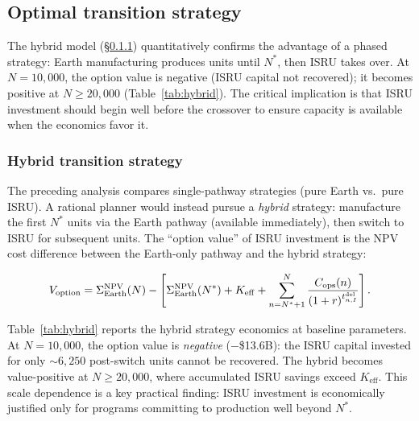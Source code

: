 \documentclass[5p,twocolumn]{elsarticle}
\begin{document}
\subsection{Optimal transition strategy}

The hybrid model (\S\ref{sec:hybrid}) quantitatively confirms the advantage of a phased strategy: Earth manufacturing produces units until $N^*$, then ISRU takes over. At $N = 10{,}000$, the option value is negative (ISRU capital not recovered); it becomes positive at $N \geq 20{,}000$ (Table~\ref{tab:hybrid}). The critical implication is that ISRU investment should begin well before the crossover to ensure capacity is available when the economics favor it.

\subsubsection{Hybrid transition strategy}
\label{sec:hybrid}

The preceding analysis compares single-pathway strategies (pure Earth vs.\ pure ISRU). A rational planner would instead pursue a \emph{hybrid} strategy: manufacture the first $N^*$ units via the Earth pathway (available immediately), then switch to ISRU for subsequent units. The ``option value'' of ISRU investment is the NPV cost difference between the Earth-only pathway and the hybrid strategy:

\begin{equation}\footnotesize
  V_{\mathrm{option}} = \Sigma_{\mathrm{Earth}}^{\mathrm{NPV}}(N) - \left[\Sigma_{\mathrm{Earth}}^{\mathrm{NPV}}(N^*) + K_{\mathrm{eff}} + \sum_{n=N^*+1}^{N} \frac{C_{\mathrm{ops}}(n)}{(1+r)^{t_{n,I}^{\mathrm{del}}}}\right].
  \label{eq:hybrid}
\end{equation}

Table~\ref{tab:hybrid} reports the hybrid strategy economics at baseline parameters. At $N = 10{,}000$, the option value is \emph{negative} ($-$\$13.6B): the ISRU capital invested for only ${\sim}6{,}250$ post-switch units cannot be recovered. The hybrid becomes value-positive at $N \geq 20{,}000$, where accumulated ISRU savings exceed $K_{\mathrm{eff}}$. This scale dependence is a key practical finding: ISRU investment is economically justified only for programs committing to production well beyond $N^*$.
\end{document}
